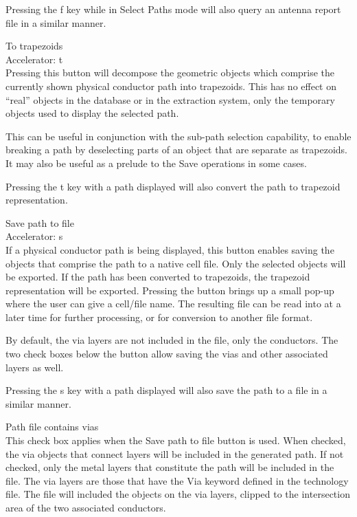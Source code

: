 \begin{description}
Pressing the {\kb f} key while in {\cb Select Paths} mode will also
query an antenna report file in a similar manner.

\item{\cb To trapezoids}\\
{\cb Accelerator:} {\kb t}\\
Pressing this button will decompose the geometric objects which
comprise the currently shown physical conductor path into trapezoids. 
This has no effect on ``real'' objects in the database or in the
extraction system, only the temporary objects used to display the
selected path.

This can be useful in conjunction with the sub-path selection
capability, to enable breaking a path by deselecting parts of an
object that are separate as trapezoids.  It may also be useful as a
prelude to the {\cb Save} operations in some cases.

Pressing the {\kb t} key with a path displayed will also convert the
path to trapezoid representation.

\item{\cb Save path to file}\\
{\cb Accelerator:} {\kb s}\\
If a physical conductor path is being displayed, this button enables
saving the objects that comprise the path to a native cell file.  Only
the selected objects will be exported.  If the path has been converted
to trapezoids, the trapezoid representation will be exported. 
Pressing the button brings up a small pop-up where the user can give a
cell/file name.  The resulting file can be read into {\Xic} at a later
time for further processing, or for conversion to another file format.

By default, the via layers are not included in the file, only the
conductors.  The two check boxes below the button allow saving the
vias and other associated layers as well.

Pressing the {\kb s} key with a path displayed will also save the path
to a file in a similar manner.

\item{\cb Path file contains vias}\\
This check box applies when the {\cb Save path to file} button is
used.  When checked, the via objects that connect layers will be
included in the generated path.  If not checked, only the metal layers
that constitute the path will be included in the file.  The via layers
are those that have the {\et Via} keyword defined in the technology
file.  The file will included the objects on the via layers, clipped
to the intersection area of the two associated conductors.


\end{description}
